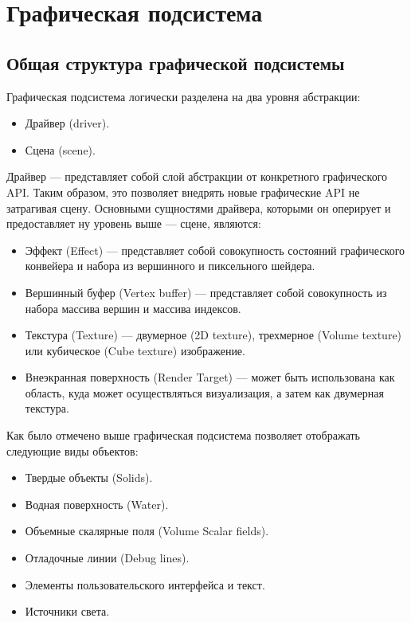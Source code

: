 \section{Графическая подсистема}

\subsection{Общая структура графической подсистемы}

Графическая подсистема логически разделена на два уровня абстракции:
\begin{itemize}
	\item	Драйвер (driver).
	\item	Сцена (scene).
\end{itemize}

Драйвер --- представляет собой слой абстракции от конкретного графического API.
Таким образом, это позволяет внедрять новые графические API не затрагивая сцену.
Основными сущностями драйвера, которыми он оперирует и предоставляет ну уровень выше --- сцене, являются:
\begin{itemize}
	\item	Эффект (Effect) --- представляет собой совокупность 
			состояний графического конвейера и набора из вершинного и пиксельного шейдера.
	\item	Вершинный буфер (Vertex buffer) --- представляет собой совокупность из набора массива вершин и массива индексов.
	\item	Текстура (Texture) --- двумерное (2D texture), трехмерное (Volume texture) или кубическое (Cube texture) изображение.
	\item	Внеэкранная поверхность (Render Target) --- может быть использована 
			как область, куда может осуществляться визуализация, а затем как двумерная текстура.
\end{itemize}


Как было отмечено выше графическая подсистема позволяет отображать следующие виды объектов:

\begin{itemize}
	\item	Твердые объекты (Solids).
	\item	Водная поверхность (Water).
	\item	Объемные скалярные поля (Volume Scalar fields).
	\item	Отладочные линии (Debug lines).
	\item	Элементы пользовательского интерфейса и текст.
	\item	Источники света.
\end{itemize}

